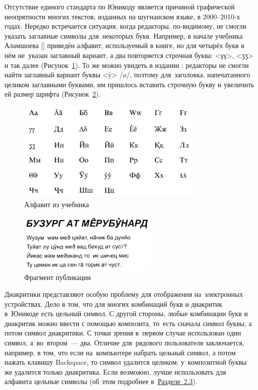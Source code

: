 Отсутствие единого стандарта по Юникоду является причиной графической неопрятности многих текстов, изданных на шугнанском языке, в 2000–2010-х годах. Нередко встречается ситуация, когда редакторы, по-видимому, не смогли указать заглавные символы для~некоторых букв. Например, в начале учебника Аламшоева [\cite*{alamshoev2014}] приведён алфавит, используемый в книге, но для четырёх букв в нём не~указан заглавный вариант, а два повторяется строчная буква: <γγ>, <ӡӡ> и так далее (Рисунок~\ref{fig:ortho2}). То же можно увидеть в издании \parencite{alinazar2017}: редакторы не смогли найти заглавный вариант буквы <ẙ> /ø/, поэтому для~заголовка, напечатанного целиком заглавными буквами, им пришлось вставить строчную букву и увеличить ей размер шрифта (Рисунок~\ref{fig:ortho3}).

\begin{figure}[h]
 \centering
 \caption{Алфавит из учебника \parencite{alamshoev2014}}
 \smallskip
 \label{fig:ortho2}
 \includegraphics[width=0.8\textwidth]{img/ortho2.jpg}
\end{figure}

\begin{figure}[h]
 \centering
 \caption{Фрагмент публикации \parencite[19]{alinazar2017}}
 \smallskip
 \label{fig:ortho3}
 \includegraphics[width=0.6\textwidth]{img/ortho3.jpg}
\end{figure}

\pagebreak[4]

Диакритики представляют особую проблему для отображения на~электронных устройствах. Дело в том, что для многих комбинаций букв и диакритик в~Юникоде есть цельный символ. С другой стороны, любые комбинации букв и диакритик можно ввести с помощью композита, то~есть сначала символ буквы, а потом символ диакритики. С точки зрения в~первом случае использован один символ, а~во~втором~— два. Отличие для~рядового пользователя заключается, например, в том, что если на~компьютере набрать цельный символ, а потом нажать клавишу Backspace, то символ удалится целиком; у~композитной буквы же удалится только диакритика. Если возможно, лучше использовать для алфавита цельные символы (об этом подробнее в~\hyperref[ortho-fonts]{Разделе~2.3}).

